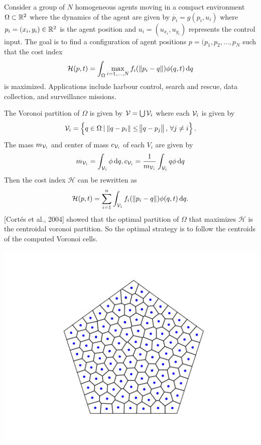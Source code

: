 \documentclass[portrait,fontscale=0.292,paperheight=48in,paperwidth=36in]{baposter}
\begin{document}
\begin{poster}
{
	Consider a group of $N$ homogeneous agents moving in a compact environment $\Omega \subset \mathbb{R}^2$ where the dynamics of the agent are given by $\dot{p_i} = g(p_i, u_i)$ where $p_i = (x_i, y_i) \in \mathbb{R}^2$ is the agent position and $u_i = (u_{x_i}, u_{y_i})$ represents the control input. The goal is to find a configuration of agent positions $p = (p_1, p_2, \dots, p_N$ such that the cost index
	\begin{equation*}
		\displaystyle \mathcal{H}(p, t) = \int_{\Omega}{\max\limits_{i=1,\dots,N}{f_i(\,\norm{p_i - q})} \phi(q, t) \dif q}
	\end{equation*}
	is maximized. Applications include harbour control, search and rescue, data collection, and surveillance missions.
}

{
	The Voronoi partition of $\Omega$ is given by $\mathcal{V} = \bigcup \mathcal{V}_i$ where each $\mathcal{V}_i$ is given by 
	\begin{equation*}
		\displaystyle \mathcal{V}_i = \left\{ q \in \Omega \: | \: \norm{q - p_i} \leq \norm{q - p_j}, \, \forall j \neq i \right\}.
	\end{equation*}
	The mass $m_{\mathcal{V}_i}$ and center of mass $c_{\mathcal{V}_i}$ of each $V_i$ are given by 
	\begin{equation*}
		\displaystyle m_{\V_i} = \int_{\V_i}{\phi \dif q}, c_{\V_i} = \frac{1}{m_{\V_i}}\int_{\V_i}{q\phi\dif q}
	\end{equation*}
	Then the cost index $\mathcal{H}$ can be rewritten as 
	\begin{equation*}
		\displaystyle \mathcal{H}(p, t) = \sum\limits_{i=1}^{n}{\int_{\V_i}{f_i(\,\norm{p_i - q}) \phi(q, t) \dif q}}.
	\end{equation*}
	\textrm{[Cort\'es et al., 2004]} showed that the optimal partition of $\Omega$ that maximizes $\mathcal{H}$ is the centroidal voronoi partition. So the optimal strategy is to follow the centroids of the computed Voronoi cells. 
	\begin{center}
		\includegraphics[scale=0.299]{fig_ex_2.png}

\end{center}}
\end{poster}
\end{document}
